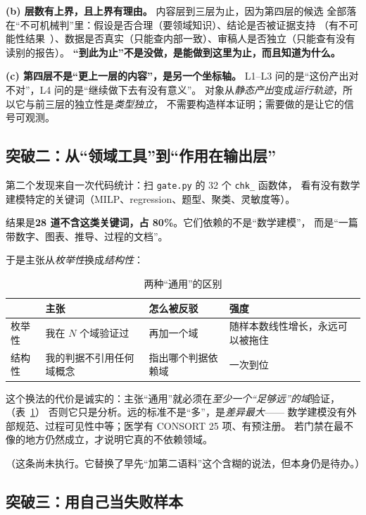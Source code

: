 \documentclass[11pt,a4paper]{article}
\newcommand{\code}[1]{\texttt{#1}}
\begin{document}
\textbf{(b) 层数有上界，且上界有理由。} 内容层到三层为止，因为第四层的候选
全部落在“不可机械判”里：假设是否合理（要领域知识）、结论是否被证据支持
（有不可能性结果~\cite{ref16}）、数据是否真实（只能查内部一致）、审稿人是否独立（只能查有没有读别的报告）。
\textbf{“到此为止”不是没做，是能做到这里为止，而且知道为什么。}

\textbf{(c) 第四层不是“更上一层的内容”，是另一个坐标轴。}
L1--L3 问的是“这份产出对不对”，L4 问的是“继续做下去有没有意义”。
对象从\emph{静态产出}变成\emph{运行轨迹}，所以它与前三层的独立性是\emph{类型独立}，
不需要构造样本证明；需要做的是让它的信号可观测。

\subsection{突破二：从“领域工具”到“作用在输出层”}

第二个发现来自一次代码统计：扫 \code{gate.py} 的 32 个 \code{chk\_} 函数体，
看有没有数学建模特定的关键词（MILP、regression、题型、聚类、灵敏度等）。

结果是\textbf{28 道不含这类关键词，占 80\%}。它们依赖的不是“数学建模”，
而是“一篇带数字、图表、推导、过程的文档”。

于是主张从\emph{枚举性}换成\emph{结构性}：

\begin{table}[tbp]\centering\small
\caption{两种“通用”的区别}\label{tab:general}
\setlength{\tabcolsep}{4pt}
\begin{tabular}{p{1.8cm}p{4.4cm}p{5.0cm}p{3.4cm}}
\toprule
& 主张 & 怎么被反驳 & 强度\\
\midrule
枚举性 & 我在 $N$ 个域验证过 & 再加一个域 & 随样本数线性增长，永远可以被拖住\\
结构性 & 我的判据不引用任何域概念 & 指出哪个判据依赖域 & 一次到位\\
\bottomrule
\end{tabular}
\end{table}

这个换法的代价是诚实的：主张“通用”就必须在\emph{至少一个“足够远”的域}验证，（表~\ref{tab:general}）
否则它只是分析。远的标准不是“多”，是\emph{差异最大}——
数学建模没有外部规范、过程可见性中等；医学有 CONSORT 25 项、有预注册。
若门禁在最不像的地方仍然成立，才说明它真的不依赖领域。

（这条尚未执行。它替换了早先“加第二语料”这个含糊的说法，但本身仍是待办。）

\subsection{突破三：用自己当失败样本}
\end{document}
